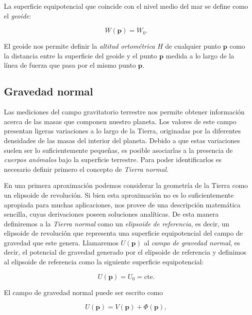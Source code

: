 La superficie equipotencial que coincide con el nivel medio del mar se define
como el \emph{geoide}:

\begin{equation}
    W(\mathbf{p}) = W_0.
\end{equation}

\noindent El geoide nos permite definir la \emph{altitud ortométrica} $H$ de
cualquier punto $\mathbf{p}$ como la distancia entre la superficie del geoide
y el punto $\mathbf{p}$ medida a lo largo de la línea de fuerza que pasa por el
mismo punto $\mathbf{p}$.


\subsection{Gravedad normal}

Las mediciones del campo gravitatorio terrestre nos permite obtener información
acerca de las masas que componen nuestro planeta. Los valores de este campo
presentan ligeras variaciones a lo largo de la Tierra, originadas por la
diferentes densidades de las masas del interior del planeta. Debido a que estas
variaciones suelen ser lo suficientemente pequeñas, es posible asociarlas a la
presencia de \emph{cuerpos anómalos} bajo la superficie terrestre. Para poder
identificarlos es necesario definir primero el concepto de \emph{Tierra
normal}.

En una primera aproximación podemos considerar la geometría de la Tierra como
un elipsoide de revolución. Si bien esta aproximación no es lo suficientemente
apropiada para muchas aplicaciones, nos provee de una descripción matemática
sencilla, cuyas derivaciones poseen soluciones analíticas.
De esta manera definiremos a la \emph{Tierra normal} como un \emph{elipsoide de
referencia}, es decir, un elipsoide de revolución que representa una superficie
equipotencial del campo de gravedad que este genera. Llamaremos $U(\mathbf{p})$
al \emph{campo de gravedad normal}, es decir, el potencial de gravedad generado
por el elipsoide de referencia y definimos al elipsoide de referencia como la
siguiente superficie equipotencial:

\begin{equation}
    U(\mathbf{p}) = U_0 = \text{cte}.
\end{equation}

El campo de gravedad normal puede ser escrito como

\begin{equation}
    U(\mathbf{p}) = V(\mathbf{p}) + \Phi(\mathbf{p}),
\end{equation}

